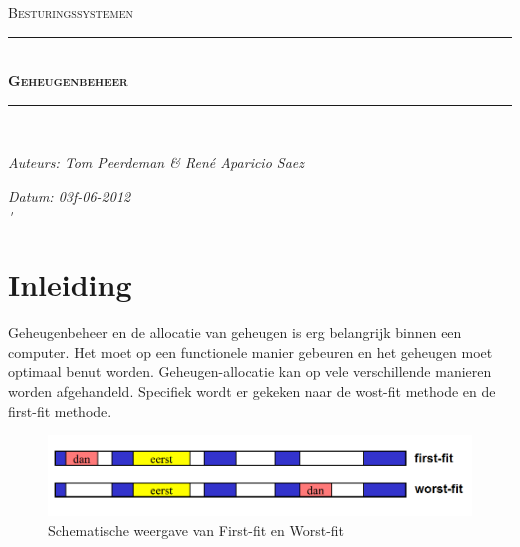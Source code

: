 \documentclass[11pt]{article}
\newcommand{\HRule}{\rule{\linewidth}{0.5mm}}
\begin{document}
	\begin{titlepage}
	\begin{center}
		\textsc{\Large Besturingssystemen}\\[0.5cm]
		\HRule \\[0,4cm]
		\textsc{\huge \bfseries Geheugenbeheer}
		\HRule \\[8cm]
		\begin{minipage}{0.4\textwidth}
			\begin{flushleft}\large
				\emph{Auteurs: Tom Peerdeman \& Ren\'e Aparicio Saez}\\
			\end{flushleft}
		\end{minipage}
		\begin{minipage}{0.4\textwidth}
			\begin{flushright}\large
			\emph{Datum: 03f-06-2012\\\'}\\
			\end{flushright}
		\end{minipage}
	\end{center}
	\end{titlepage}

	\tableofcontents
	\newpage

	\section{Inleiding}\label{sec:inleiding}
	Geheugenbeheer en de allocatie van geheugen is erg belangrijk binnen een computer. Het moet op een functionele manier gebeuren en het geheugen moet optimaal benut worden. Geheugen-allocatie kan op vele verschillende manieren worden afgehandeld. Specifiek wordt er gekeken naar de wost-fit methode en de first-fit methode.\\[4cm]
	\begin{figure}[h]
		\begin{center}
		\includegraphics[width=1\textwidth]{geheugenbeheer.png}
		\caption{Schematische weergave van First-fit en Worst-fit}
		\end{center}
	\end{figure}

	\newpage
\end{document}
